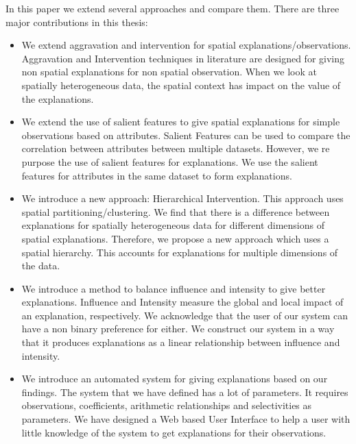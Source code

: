 In this paper we extend several approaches and compare them. There are three major contributions in this thesis:
\begin{itemize}

\item We extend aggravation and intervention for spatial explanations/observations. Aggravation and Intervention techniques in literature are designed for giving non spatial explanations for non spatial observation. When we look at spatially heterogeneous data, the spatial context has impact on the value of the explanations.

\item We extend the use of salient features to give spatial explanations for simple observations based on attributes. Salient Features can be used to compare the correlation between attributes between multiple datasets. However, we re purpose the use of salient features for explanations. We use the salient features for attributes in the same dataset to form explanations.
\item We introduce a new approach: Hierarchical Intervention. This approach uses spatial partitioning/clustering. We find that there is a difference between explanations for spatially heterogeneous data for different dimensions of spatial explanations. Therefore, we propose a new approach which uses a spatial hierarchy. This accounts for explanations for multiple dimensions of the data.

\item We introduce a method to balance influence and intensity to give better explanations. Influence and Intensity measure the global and local impact of an explanation, respectively. We acknowledge that the user of our system can have a non binary preference for either. We construct our system in a way that it produces explanations as a linear relationship between influence and intensity.

\item We introduce an automated system for giving explanations based on our findings. The system that we have defined has a lot of parameters. It requires observations, coefficients, arithmetic relationships and selectivities as parameters. We have designed a Web based User Interface to help a user with little knowledge of the system to get explanations for their observations.
\end{itemize}

